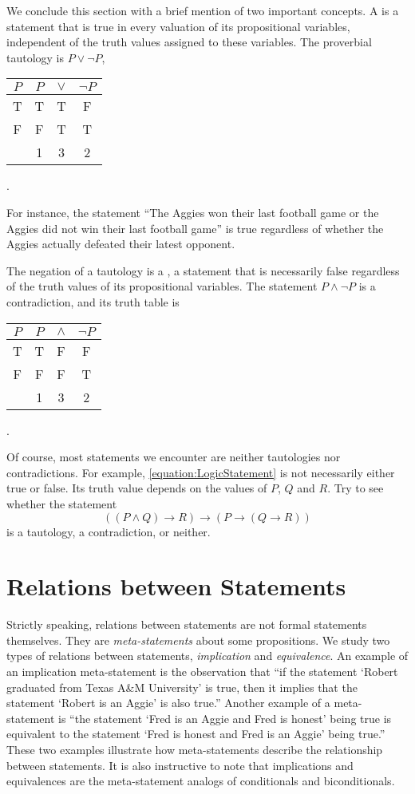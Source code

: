 We conclude this section with a brief mention of two important concepts.
A  is a statement that is true in every valuation of its propositional variables, independent of the truth values assigned to these variables.
The proverbial tautology is $P \vee \neg P$,
\begin{center}
\begin{tabular}{|c|c:c:c|}
\hline
$P$ & $P$ & $\vee$ & $\neg P$ \tabularnewline
\hline
T & T & T & F \tabularnewline
F & F & T & T \tabularnewline
& 1 & 3 & 2 \tabularnewline
\hline
\end{tabular} .
\end{center}
For instance, the statement ``The Aggies won their last football game or the Aggies did not win their last football game'' is true regardless of whether the Aggies actually defeated their latest opponent.

The negation of a tautology is a , a statement that is necessarily false regardless of the truth values of its propositional variables.
The statement $P \wedge \neg P$ is a contradiction, and its truth table is
\begin{center}
\begin{tabular}{|c|c:c:c|}
\hline
$P$ & $P$ & $\wedge$ & $\neg P$ \tabularnewline
\hline
T & T & F & F \tabularnewline
F & F & F & T \tabularnewline
& 1 & 3 & 2 \tabularnewline
\hline
\end{tabular} .
\end{center}

Of course, most statements we encounter are neither tautologies nor contradictions.
For example, \eqref{equation:LogicStatement} is not necessarily either true or false.
Its truth value depends on the values of $P$, $Q$ and $R$.
Try to see whether the statement
\begin{equation*}
((P \wedge Q) \rightarrow R) \rightarrow (P \rightarrow (Q \rightarrow R))
\end{equation*}
is a tautology, a contradiction, or neither.


\section{Relations between Statements}
\label{section:Relations}

Strictly speaking, relations between statements are not formal statements themselves.
They are \emph{meta-statements} about some propositions.
We study two types of relations between statements, \emph{implication} and \emph{equivalence}.
An example of an implication meta-statement is the observation that ``if the statement `Robert graduated from Texas A\&M University' is true, then it implies that the statement `Robert is an Aggie' is also true.''
Another example of a meta-statement is ``the statement `Fred is an Aggie and Fred is honest' being true is equivalent to the statement `Fred is honest and Fred is an Aggie' being true.''
These two examples illustrate how meta-statements describe the relationship between statements.
It is also instructive to note that implications and equivalences are the meta-statement analogs of conditionals and biconditionals.

